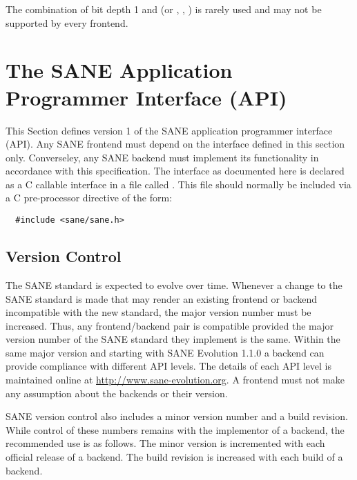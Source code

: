 \documentclass[11pt,DVIps]{report}
\begin{document}
The combination of bit depth 1 and  (or
, , )
is rarely used and may not be supported by every frontend.

\chapter{The SANE Application Programmer Interface (API)}\label{chap:api}

This Section defines version 1 of the SANE application
programmer interface (API).  Any SANE frontend must depend on the
interface defined in this section only.  Converseley, any SANE backend
must implement its functionality in accordance with this
specification.  The interface as documented here is declared as a C
callable interface in a file called .  This file should
normally be included via a C pre-processor directive of the form:
\begin{verbatim}
  #include <sane/sane.h>
\end{verbatim}


\section{Version Control}

The SANE standard is expected to evolve over time.  Whenever a change
to the SANE standard is made that may render an existing frontend or
backend incompatible with the new standard, the major version number
must be increased.  Thus, any frontend/backend pair is compatible
provided the major version number of the SANE standard they implement
is the same.  Within the same major version and starting with
SANE Evolution 1.1.0 a backend can provide compliance with different
API levels.  The details of each API level is maintained online
at \url{http://www.sane-evolution.org}. A frontend must not make any assumption
about the backends or their version.

SANE version control also includes a minor version number and a build
revision.  While control of these numbers remains with the implementor
of a backend, the recommended use is as follows.  The minor version is
incremented with each official release of a backend.  The build
revision is increased with each build of a backend.
\end{document}
